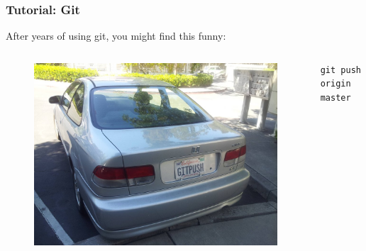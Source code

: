 \begin{frame}[fragile]
    \frametitle{Tutorial: Git}
    After years of using git, you might find this funny: 
    \begin{columns}
        \begin{column}{0.5\textwidth}
            \begin{figure}
                \begin{center}
                    \includegraphics[width=\textwidth]{images/gitpush.jpg}
                \end{center}
            \end{figure}
        \end{column}
        \begin{column}{0.5\textwidth}
            \begin{lstlisting}
git push origin master
            \end{lstlisting}
        \end{column}
    \end{columns} 
\end{frame}


